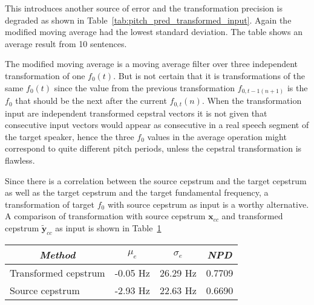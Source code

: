 This introduces another source of error and the transformation precision is degraded as shown in Table~\ref{tab:pitch_pred_transformed_input}. Again the modified moving average had the lowest standard deviation. The table shows an average result from 10 sentences.

The modified moving average is a moving average filter over three independent transformation of one $f_0(t)$. But is not certain that it is transformations of the same $f_0(t)$ since the value from the previous transformation $f_{0,t-1(n+1)}$ is the $f_0$ that should be the next after the current $f_{0,t}(n)$. When the transformation input are independent transformed cepstral vectors it is not given that consecutive input vectors would appear as consecutive in a real speech segment of the target speaker, hence the three $f_0$ values in the average operation might correspond to quite different pitch periods, unless the cepstral transformation is flawless.

Since there is a correlation between the source cepstrum and the target cepstrum as well as the target cepstrum and the target fundamental frequency, a transformation of target $f_0$ with source cepstrum as input is a worthy alternative. A comparison of transformation with source cepstrum $\mathbf{x}_{cc}$ and transformed cepstrum $\mathbf{\tilde{y}}_{cc}$ as input is shown in Table~\ref{tab:f0_source_transform}
\begin{table}[htbp]
	\begin{center}
		\label{tab:f0_source_transform}
		\begin{tabular}{lrrr}
			\toprule
			\multicolumn{1}{c}{\emph{Method}} & \multicolumn{1}{c}{\emph{$\mu_e$}} & \multicolumn{1}{c}{\emph{$\sigma_e$}} & \multicolumn{1}{c}{\emph{NPD}}\\
			\midrule
			Transformed cepstrum & -0.05 Hz & 26.29 Hz & 0.7709\\
			Source cepstrum & -2.93 Hz & 22.63 Hz & 0.6690\\
			\bottomrule			
		\end{tabular}		
	\end{center}	
\end{table}

